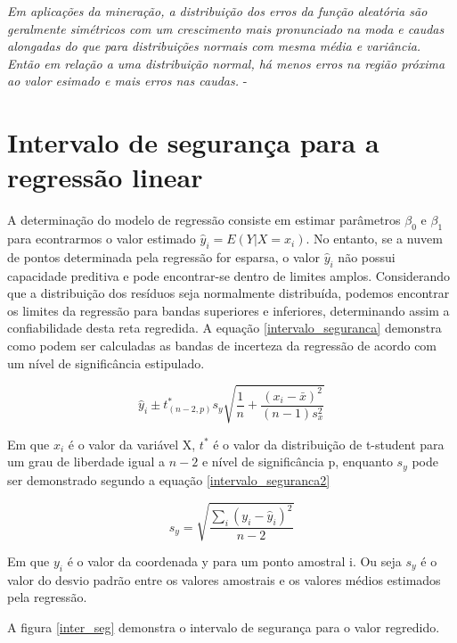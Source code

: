 \begin{remark}
	\textit{Em aplicações da mineração, a distribuição dos erros da função aleatória são geralmente simétricos com um crescimento mais pronunciado na moda e caudas alongadas do que para distribuições normais com mesma média e variância. Então em relação a uma distribuição normal, há menos erros na região próxima ao valor esimado e mais erros nas caudas.} - \cite{journel1978mining}
\end{remark}
 
 \section{Intervalo de segurança para a regressão linear}
 
 A determinação do modelo de regressão consiste em estimar parâmetros $\beta_{0}$ e $\beta_{1}$ para econtrarmos o valor estimado $\hat{y}_{i} = E(Y|X=x_{i})$. No entanto, se a nuvem de pontos determinada pela regressão for esparsa, o valor $\hat{y}_{i}$ não possui capacidade preditiva e pode encontrar-se dentro de limites amplos. Considerando que a distribuição dos resíduos seja normalmente distribuída, podemos encontrar os limites da regressão para bandas superiores e inferiores, determinando assim a confiabilidade desta reta regredida.  A equação \eqref{intervalo_seguranca} demonstra como podem ser calculadas as bandas de incerteza da regressão de acordo com um nível de significância estipulado. 
 
 \begin{equation}\label{intervalo_seguranca}
	 \hat{y}_{i} \pm  t^{*}_{(n-2,p)} s_{y} \sqrt{\frac{1}{n}+\frac{(x_{i}-\bar{x})^2}{(n-1)s^2_{x}}}
 \end{equation}
 
 Em que $x_{i}$ é o valor da variável X, $t^*$ é o valor da distribuição de t-student para um grau de liberdade igual a $n-2$ e nível de significância p, enquanto $s_{y}$ pode ser demonstrado segundo a equação \eqref{intervalo_seguranca2}
 
  \begin{equation}\label{intervalo_seguranca2}
  s_{y} = \sqrt{\frac{\sum_{i}(y_{i}-\hat{y}_{i})^2}{n-2}}
  \end{equation}
   
  Em que $y_{i}$ é o valor da coordenada y para um ponto amostral i. Ou seja $s_{y}$ é o valor do desvio padrão entre os valores amostrais e os valores médios estimados pela regressão. 
  
  A figura \eqref{inter_seg} demonstra o intervalo de segurança para o valor regredido. 
  

